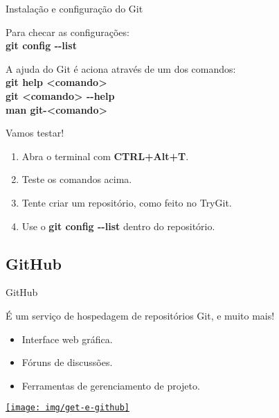 \documentclass[a4paper]{beamer}
\begin{document}
\begin{frame}{Instalação e configuração do Git}

Para checar as configurações:\\
\textbf{git config -{}-list}
\pause

\vspace{10pt}
A ajuda do Git é aciona através de um dos comandos:\\
\textbf{git help <comando>}\\
\textbf{git <comando> -{}-help}\\
\textbf{man git-<comando>}
\pause

\vspace{10pt}
Vamos testar!
\begin{enumerate}
\item Abra o terminal com \textbf{CTRL+Alt+T}.
\item Teste os comandos acima.
\item Tente criar um repositório, como feito no TryGit.
\item Use o \textbf{git config -{}-list} dentro do repositório.
\end{enumerate}

\end{frame}

\subsection{GitHub}

\begin{frame}{GitHub}

É um serviço de hospedagem de repositórios Git, e muito mais!

\begin{itemize}
\item Interface web gráfica.
\item Fóruns de discussões.
\item Ferramentas de gerenciamento de projeto.
\end{itemize}

\begin{center}
\href{https://github.com/}{\texttt{[image: img/get-e-github]}}
\end{center}

\end{frame}
\end{document}
